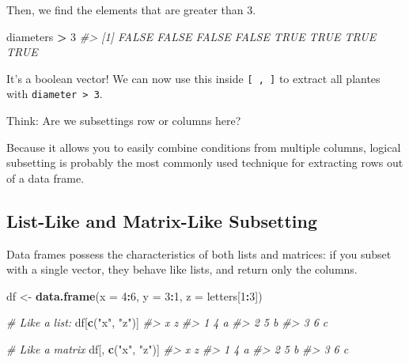 \documentclass[]{book}
\newenvironment{Shaded}{\begin{snugshade}}{\end{snugshade}}
\newcommand{\CommentTok}[1]{\textcolor[rgb]{0.56,0.35,0.01}{\textit{#1}}}
\newcommand{\DataTypeTok}[1]{\textcolor[rgb]{0.13,0.29,0.53}{#1}}
\newcommand{\DecValTok}[1]{\textcolor[rgb]{0.00,0.00,0.81}{#1}}
\newcommand{\KeywordTok}[1]{\textcolor[rgb]{0.13,0.29,0.53}{\textbf{#1}}}
\newcommand{\NormalTok}[1]{#1}
\newcommand{\OperatorTok}[1]{\textcolor[rgb]{0.81,0.36,0.00}{\textbf{#1}}}
\newcommand{\StringTok}[1]{\textcolor[rgb]{0.31,0.60,0.02}{#1}}
\begin{document}
Then, we find the elements that are greater than 3.

\begin{Shaded}
\begin{Highlighting}[]
\NormalTok{diameters }\OperatorTok{>}\StringTok{ }\DecValTok{3}
\CommentTok{#> [1] FALSE FALSE FALSE FALSE  TRUE  TRUE  TRUE  TRUE}
\end{Highlighting}
\end{Shaded}

It's a boolean vector! We can now use this inside \texttt{{[}\ ,\ {]}} to extract all plantes with \texttt{diameter\ \textgreater{}\ 3}.

Think: Are we subsettings row or columns here?

\begin{Shaded}
\end{Shaded}

Because it allows you to easily combine conditions from multiple columns, logical subsetting is probably the most commonly used technique for extracting rows out of a data frame.

\hypertarget{list-like-and-matrix-like-subsetting}{%
\subsection{List-Like and Matrix-Like Subsetting}\label{list-like-and-matrix-like-subsetting}}

Data frames possess the characteristics of both lists and matrices: if you subset with a single vector, they behave like lists, and return only the columns.

\begin{Shaded}
\begin{Highlighting}[]
\NormalTok{df <-}\StringTok{ }\KeywordTok{data.frame}\NormalTok{(}\DataTypeTok{x =} \DecValTok{4}\OperatorTok{:}\DecValTok{6}\NormalTok{, }\DataTypeTok{y =} \DecValTok{3}\OperatorTok{:}\DecValTok{1}\NormalTok{, }\DataTypeTok{z =}\NormalTok{ letters[}\DecValTok{1}\OperatorTok{:}\DecValTok{3}\NormalTok{])}

\CommentTok{# Like a list:}
\NormalTok{df[}\KeywordTok{c}\NormalTok{(}\StringTok{"x"}\NormalTok{, }\StringTok{"z"}\NormalTok{)]}
\CommentTok{#>   x z}
\CommentTok{#> 1 4 a}
\CommentTok{#> 2 5 b}
\CommentTok{#> 3 6 c}

\CommentTok{# Like a matrix}
\NormalTok{df[, }\KeywordTok{c}\NormalTok{(}\StringTok{"x"}\NormalTok{, }\StringTok{"z"}\NormalTok{)]}
\CommentTok{#>   x z}
\CommentTok{#> 1 4 a}
\CommentTok{#> 2 5 b}
\CommentTok{#> 3 6 c}
\end{Highlighting}
\end{Shaded}
\end{document}
